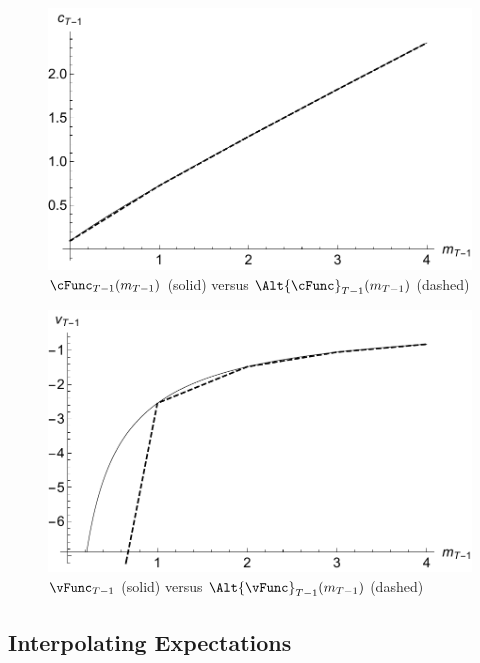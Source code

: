 \documentclass[titlepage, headings=optiontotocandhead]{\econtex}
\begin{document}
\hypertarget{PlotcTm1Simple}{}
\begin{figure}
  \includegraphics{./Figures/PlotcTm1Simple}
  \caption{$\cFunc_{T-1}({m}_{T-1})$ (solid) versus $\Alt{\cFunc}_{T-1}({m}_{T-1})$ (dashed)}
  \label{fig:PlotcTm1Simple}
\end{figure}

\hypertarget{PlotvTm1Simple}{}
\begin{figure}
  \includegraphics{./Figures/PlotVTm1Simple}
  \caption{$\vFunc_{T-1}$ (solid) versus $\Alt{\vFunc}_{T-1}({m}_{T-1})$ (dashed)}
  \label{fig:PlotVTm1Simple}
\end{figure}

\hypertarget{Interpolating-Expectations}{}
\subsection{Interpolating Expectations}

\end{document}
